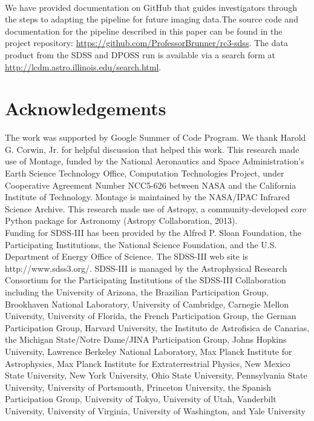 \documentclass[5p]{elsarticle}
\begin{document}
\\
\indent We have provided documentation on GitHub  that guides investigators through the steps to adapting the pipeline for future imaging data.The source code and documentation for the pipeline described in this paper can be found in the project repository: \url{https://github.com/ProfessorBrunner/rc3-sdss}. The data product from the SDSS and DPOSS run is available via a search form at \url{http://lcdm.astro.illinois.edu/search.html}.

\section*{Acknowledgements}
\footnotesize
\indent The work was supported by Google Summer of Code Program. We thank Harold G. Corwin, Jr. for helpful discussion that helped this work. This research made use of Montage, funded by the National Aeronautics and Space Administration's Earth Science Technology Office, Computation Technologies Project, under Cooperative Agreement Number NCC5-626 between NASA and the California Institute of Technology. Montage is maintained by the NASA/IPAC Infrared Science Archive. This research made use of Astropy, a community-developed core Python package for Astronomy (Astropy Collaboration, 2013).
\\
\indent  Funding for SDSS-III has been provided by the Alfred P. Sloan Foundation, the Participating Institutions, the National Science Foundation, and the U.S. Department of Energy Office of Science. The SDSS-III web site is http://www.sdss3.org/. SDSS-III is managed by the Astrophysical Research Consortium for the Participating Institutions of the SDSS-III Collaboration including the University of Arizona, the Brazilian Participation Group, Brookhaven National Laboratory, University of Cambridge, Carnegie Mellon University, University of Florida, the French Participation Group, the German Participation Group, Harvard University, the Instituto de Astrofisica de Canarias, the Michigan State/Notre Dame/JINA Participation Group, Johns Hopkins University, Lawrence Berkeley National Laboratory, Max Planck Institute for Astrophysics, Max Planck Institute for Extraterrestrial Physics, New Mexico State University, New York University, Ohio State University, Pennsylvania State University, University of Portsmouth, Princeton University, the Spanish Participation Group, University of Tokyo, University of Utah, Vanderbilt University, University of Virginia, University of Washington, and Yale University


  
\end{document}
